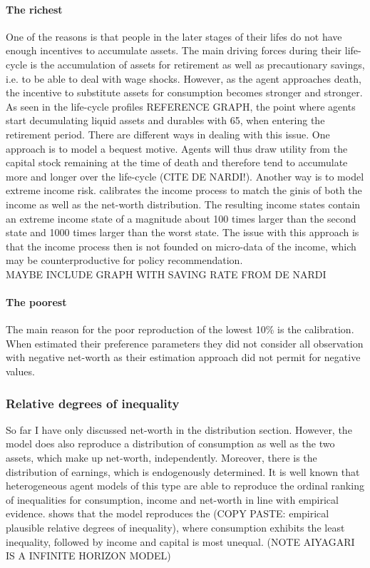 \documentclass[a4paper,12pt]{article}
\begin{document}
\paragraph{The richest}
One of the reasons is that people in the later stages of their lifes do not have enough incentives to accumulate assets. The main driving forces during their life-cycle is the accumulation of assets for retirement as well as precautionary savings, i.e. to be able to deal with wage shocks. However, as the agent approaches death, the incentive to substitute assets for consumption becomes stronger and stronger. As seen in the life-cycle profiles REFERENCE GRAPH, the point where agents start decumulating liquid assets and durables with 65, when entering the retirement period. There are different ways in dealing with this issue. One approach is to model a bequest motive. Agents will thus draw utility from the capital stock remaining at the time of death and therefore tend to accumulate more and longer over the life-cycle (CITE DE NARDI!). Another way is to model extreme income risk. \citep{castaneda2003} calibrates the income process to match the ginis of both the income as well as the net-worth distribution. The resulting income states contain an extreme income state of a magnitude about 100 times larger than the second state and 1000 times larger than the worst state. The issue with this approach is that the income process then is not founded on micro-data of the income, which may be counterproductive for policy recommendation. 
\\
MAYBE INCLUDE GRAPH WITH SAVING RATE FROM DE NARDI
\\
\paragraph{The poorest}
The main reason for the poor reproduction of the lowest 10\% is the calibration. When \cite{hintermaier2011} estimated their preference parameters they did not consider all observation with negative net-worth as their estimation approach did not permit for negative values.

\subsubsection{Relative degrees of inequality}
So far I have only discussed net-worth in the distribution section. However, the model does also reproduce a distribution of consumption as well as the two assets, which make up net-worth, independently. Moreover, there is the distribution of earnings, which is endogenously determined. It is well known that heterogeneous agent models of this type are able to reproduce the ordinal ranking of inequalities for consumption, income and net-worth in line with empirical evidence.\cite{aiyagari1994} shows that the model reproduces the (COPY PASTE: empirical plausible relative degrees of inequality), where consumption exhibits the least inequality, followed by income and capital is most unequal. (NOTE AIYAGARI IS A INFINITE HORIZON MODEL) 
\end{document}
